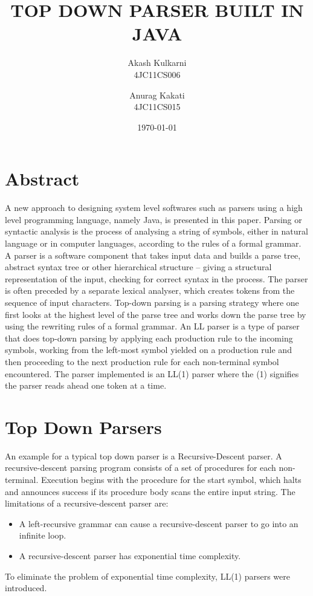\documentclass[12pt]{article}
\title{\textbf{TOP DOWN PARSER BUILT IN JAVA}}
\author{Akash Kulkarni\\4JC11CS006\and Anurag Kakati\\4JC11CS015}
\date{\today}
\begin{document}
\maketitle
\section{Abstract}
A new approach to designing system level softwares such as parsers using a high level programming language, namely Java, is presented in this paper. Parsing or syntactic analysis is the process of analysing a string of symbols, either in natural language or in computer languages, according to the rules of a formal grammar. A parser is a software component that takes input data and builds a parse tree, abstract syntax tree or other hierarchical structure – giving a structural representation of the input, checking for correct syntax in the process. The parser is often preceded by a separate lexical analyser, which creates tokens from the sequence of input characters. Top-down parsing is a parsing strategy where one first looks at the highest level of the parse tree and works down the parse tree by using the rewriting rules of a formal grammar. An LL parser is a type of parser that does top-down parsing by applying each production rule to the incoming symbols, working from the left-most symbol yielded on a production rule and then proceeding to the next production rule for each non-terminal symbol encountered. The parser implemented is an LL(1) parser where the (1) signifies the parser reads ahead one token at a time.
\section{Top Down Parsers}
An example for a typical top down parser is a Recursive-Descent parser. A recursive-descent parsing program consists of a set of procedures for each non-terminal. Execution begins with the procedure for the start symbol, which halts and announces success if its procedure body scans the entire input string. The limitations of a recursive-descent parser are:
\begin{itemize}
\item A left-recursive grammar can cause a recursive-descent parser to go into an infinite loop.
\item A recursive-descent parser has exponential time complexity.
\end{itemize}
To eliminate the problem of exponential time complexity, LL(1) parsers were introduced.
\end{document}
